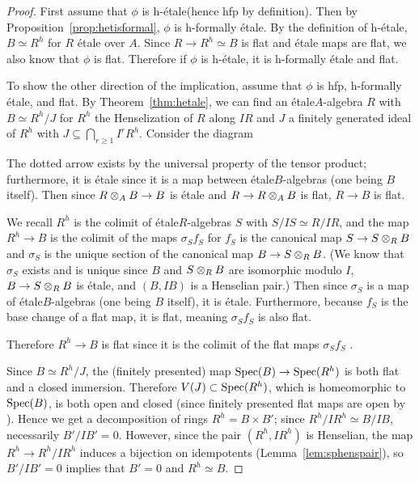 \documentclass[12pt]{article}
\newcommand{\spec}{{\rm Spec}}
\newcommand{\Et}{\'etale\xspace}
\newcommand{\hfp}{hfp\xspace}
\newcommand{\hetale}{h-\'etale\xspace}
\newcommand{\hfetale}{h-formally \'etale\xspace}
\newcommand{\spcite}[2]{\cite[\href{https://stacks.math.columbia.edu/tag/#1}{{#2} {#1}}]{stackp}}
\theoremstyle{definition}
\numberwithin{equation}{subsection}
\begin{document}
\begin{proof} 

First assume that $\phi$ is \hetale (hence \hfp by definition). Then by Proposition~\ref{prop:hetisformal}, $\phi$ is \hfetale. By the definition of \hetale, $B \simeq R^h$ for $R$ \Et over $A$. Since $R \to R^h \simeq B$ is flat and \Et maps are flat, we also know that $\phi$ is flat. Therefore if $\phi$ is \hetale, it is \hfetale and flat.


To show the other direction of the implication, assume that $\phi$ is \hfp, \hfetale, and flat. By Theorem~\ref{thm:hetale}, we can find an \Et $A$-algebra $R$ with $B \simeq R^h/J$ for $R^h$ the Henselization of $R$ along $IR$ and $J$ a finitely generated ideal of $R^h$ with $J \subseteq \bigcap_{r \ge 1} I^rR^h$. Consider the diagram

\begin{center}
\end{center} \vspace{-.25in}

The dotted arrow exists by the universal property of the tensor product; furthermore, it is \Et since it is a map between \Et $B$-algebras (one being $B$ itself). Then since $R \tens_A B \to B$ is \Et and $R \to R \tens_A B$ is flat, $R \to B$ is flat.

We recall $R^h$ is the colimit of \Et $R$-algebras $S$ with $S/IS \simeq R/IR$, and the map $R^h \to B$ is the colimit of the maps $\sigma_Sf_S$ for $f_S$ is the canonical map $S \to S \tens_R B$ and $\sigma_S$ is the unique section of the canonical map $B \to S \tens_R B$. (We know that $\sigma_S$ exists and is unique since $B$ and $S \tens_R B$ are isomorphic modulo $I$, $B \to S \tens_R B$ is \Et, and $(B,IB)$ is a Henselian pair.) Then since $\sigma_S$ is a map of \Et $B$-algebras (one being $B$ itself), it is \Et. Furthermore, because $f_S$ is the base change of a flat map, it is flat, meaning $\sigma_Sf_S$ is also flat. 

Therefore $R^h \to B$ is flat since it is the colimit of the flat maps $\sigma_Sf_S$ \spcite{05UT}{Lemma}. 

Since $B \simeq R^h/J$, the (finitely presented) map $\spec(B) \to \spec(R^h)$ is both flat and a closed immersion. Therefore $V(J) \subset \spec(R^h)$, which is homeomorphic to $\spec(B)$, is both open and closed (since finitely presented flat maps are open by \spcite{01UA}{Lemma}). Hence we get a decomposition of rings $R^h = B \times B'$; since $R^h/IR^h \simeq B/IB$, necessarily $B'/IB'=0$. However, since the pair $(R^h,IR^h)$ is Henselian, the map $R^h \to R^h/IR^h$ induces a bijection on idempotents (Lemma~\ref{lem:sphenspair}), so $B'/IB'=0$ implies that $B'=0$ and $R^h \simeq B$. \end{proof}
\end{document}
